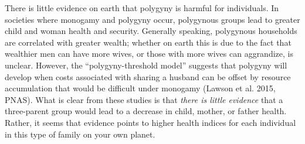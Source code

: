 



There is little evidence on earth that polygyny is harmful for individuals. In societies where monogamy and polygyny occur, polygynous groups lead to greater child and woman health and security. Generally speaking, polygynous households are correlated with greater wealth; whether on earth this is due to the fact that wealthier men can have more wives, or those with more wives can aggrandize, is unclear. However, the “polygyny-threshold model” suggests that polygyny will develop when costs associated with sharing a husband can be offset by resource accumulation that would be difficult under monogamy (Lawson et al. 2015, PNAS). What is clear from these studies is that \textit{there is little evidence} that a three-parent group would lead to a decrease in child, mother, or father health. Rather, it seems that evidence points to higher health indices for each individual in this type of family on your own planet.

